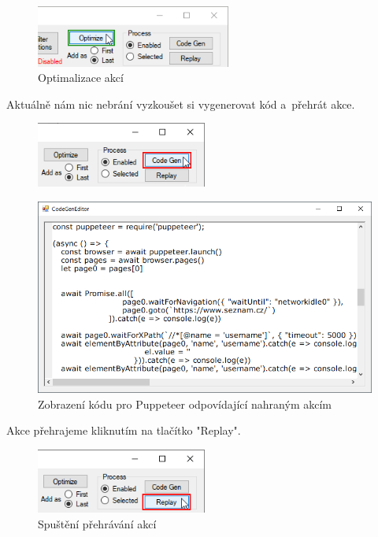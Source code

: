\documentclass[12pt, a4paper, twoside]{article}
\begin{document}
	\begin{figure}[H]
	\centering
	\includegraphics[width=0.57\textwidth, center]{optimizeClick.png}
	\caption{Optimalizace akcí}
	\end{figure}
	\newpage
	Aktuálně nám nic nebrání vyzkoušet si vygenerovat kód a~přehrát akce. 
	\begin{figure}[H]
		\centering
		\includegraphics[width=0.50\textwidth]{codeGenButton.png}
	\end{figure}
	\vspace{-0.7cm}
	\begin{figure}[H]
		\centering
		\textdownarrow
	\end{figure}
	\vspace{-0.6cm}
	\begin{figure}[H]
		\centering
		\includegraphics[width=1.0\textwidth]{codeGenEditor.png}
		\caption{Zobrazení kódu pro Puppeteer odpovídající nahraným akcím}
	\end{figure}
	Akce přehrajeme kliknutím na tlačítko "Replay". 
	\begin{figure}[H]
		\centering
		\includegraphics[width=0.50\textwidth]{replayButton.png}
		\caption{Spuštění přehrávání akcí}
	\end{figure}
\end{document}
